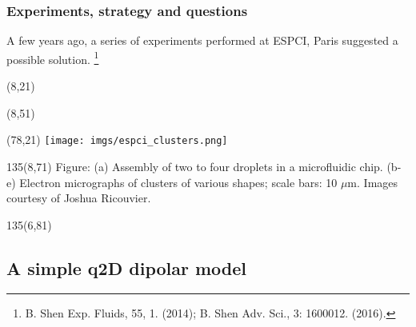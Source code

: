 \begin{frame}[t]
  \frametitle{Experiments, strategy and questions}

  A few years ago, a series of experiments performed at ESPCI, Paris suggested a possible solution.%
  \footnote{B. Shen \etal Exp. Fluids, 55, 1. (2014); B. Shen \etal Adv. Sci., 3: 1600012. (2016).}
  
  \begin{textblock}{80}(8,21)    
  \end{textblock}
  \begin{textblock}{80}(8,51)    
  \end{textblock}
  \begin{textblock}{80}(78,21)    
    \texttt{[image: imgs/espci\_clusters.png]}
  \end{textblock}
  \begin{textblock}{135}(8,71)    
    Figure: (a) Assembly of two to four droplets in a microfluidic chip.
    (b-e) Electron micrographs of clusters of various shapes; scale bars: 10 $\mu$m.
    Images courtesy of Joshua Ricouvier.
  \end{textblock}

  \begin{textblock}{135}(6,81)  
  \end{textblock}
  
\end{frame}

\hypertarget{dipolar}{%
  \subsection{A simple q2D dipolar model}}

